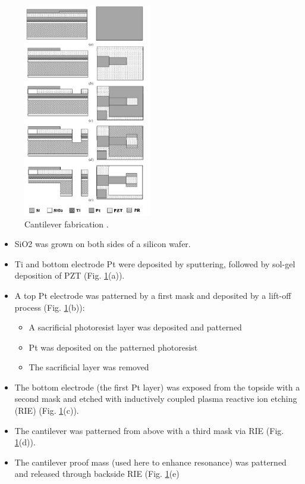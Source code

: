 \begin{figure}
\centering
\includegraphics[width=0.5\textwidth]{cantifab}
\caption{Cantilever fabrication \cite{shen2008design}.}
\label{fig:fab}
\end{figure}

\begin{itemize}
\item SiO2 was grown on both sides of a silicon wafer.
\item Ti and bottom electrode Pt were deposited by sputtering, followed by sol-gel deposition of PZT (Fig. \ref{fig:fab}(a)).
\item A top Pt electrode was patterned by a first mask and deposited by a lift-off process (Fig. \ref{fig:fab}(b)):
  \begin{itemize}
  \item A sacrificial photoresist layer was deposited and patterned
  \item Pt was deposited on the patterned photoresist
  \item The sacrificial layer was removed
  \end{itemize}
\item The bottom electrode (the first Pt layer) was exposed from the topside with a second mask and etched with inductively coupled plasma reactive ion etching (RIE) (Fig. \ref{fig:fab}(c)).
\item The cantilever was patterned from above with a third mask via RIE (Fig. \ref{fig:fab}(d)).
\item The cantilever proof mass (used here to enhance resonance) was patterned and released through backside RIE (Fig. \ref{fig:fab}(e)
\end{itemize}

